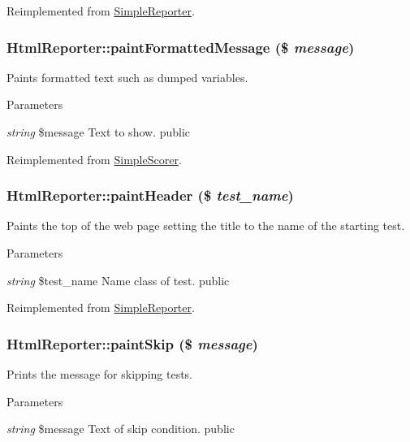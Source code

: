 Reimplemented from \hyperlink{class_simple_reporter_a447a6e823a5c17b1bd5f922a0b18fded}{SimpleReporter}.\hypertarget{class_html_reporter_ac759b018db079ff7f6cc45ee43d3ef12}{
\subsubsection[{paintFormattedMessage}]{\setlength{\rightskip}{0pt plus 5cm}HtmlReporter::paintFormattedMessage (\$ {\em message})}}
\label{class_html_reporter_ac759b018db079ff7f6cc45ee43d3ef12}
Paints formatted text such as dumped variables. 
\begin{DoxyParams}{Parameters}
\item[{\em string}]\$message Text to show.  public \end{DoxyParams}


Reimplemented from \hyperlink{class_simple_scorer_a19d5b72bd448cc22636569e20b64f607}{SimpleScorer}.\hypertarget{class_html_reporter_a1d579bc4e86295e07da8f4e364092010}{
\subsubsection[{paintHeader}]{\setlength{\rightskip}{0pt plus 5cm}HtmlReporter::paintHeader (\$ {\em test\_\-name})}}
\label{class_html_reporter_a1d579bc4e86295e07da8f4e364092010}
Paints the top of the web page setting the title to the name of the starting test. 
\begin{DoxyParams}{Parameters}
\item[{\em string}]\$test\_\-name Name class of test.  public \end{DoxyParams}


Reimplemented from \hyperlink{class_simple_reporter_a682fc7003bca1442734b7ddbdf270b75}{SimpleReporter}.\hypertarget{class_html_reporter_a6414bae0e65badca0d33030bd281f884}{
\subsubsection[{paintSkip}]{\setlength{\rightskip}{0pt plus 5cm}HtmlReporter::paintSkip (\$ {\em message})}}
\label{class_html_reporter_a6414bae0e65badca0d33030bd281f884}
Prints the message for skipping tests. 
\begin{DoxyParams}{Parameters}
\item[{\em string}]\$message Text of skip condition.  public \end{DoxyParams}


